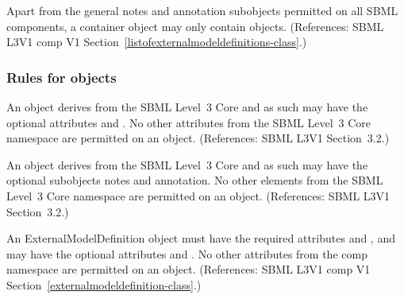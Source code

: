 \begin{sbmlenum}
 { Apart from the general notes and annotation
  subobjects permitted on all SBML components, a
  \ListOfExternalModelDefinitions container object may only contain
  \ExternalModelDefinition objects.
  (References: SBML L3V1 comp V1 Section~\ref{listofexternalmodeldefinitions-class}.) }
  




\end{sbmlenum} \subsubsection*{Rules for  objects} \begin{sbmlenum}

 { An \ExternalModelDefinition object derives from the SBML
  Level~3 Core  and as such may have the optional attributes
   and . No other attributes from the SBML
  Level~3 Core namespace are permitted on an \ExternalModelDefinition object.
  (References: SBML L3V1 Section~3.2.) }
   

 { An \ExternalModelDefinition object derives from the SBML
  Level~3 Core  and as such may have the optional subobjects
  notes and annotation. No other elements from the SBML
  Level~3 Core namespace are permitted on an \ExternalModelDefinition object.
  (References: SBML L3V1 Section~3.2.) }
   

 { An ExternalModelDefinition object must have the
  required attributes  and , and may have
  the optional attributes  and .
  No other attributes from the comp namespace are permitted on an
  \ExternalModelDefinition object.
  (References: SBML L3V1 comp V1 Section~\ref{externalmodeldefinition-class}.) }



\end{sbmlenum}
